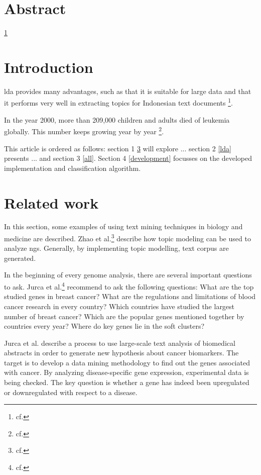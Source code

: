 





\chapter{Abstract}\label{abstract}
\ref{abstract}

\chapter{Introduction}\label{introduction}

\gls{lda} provides many advantages, such as that it is suitable for large data and that it performs very well in extracting topics for Indonesian text documents \footnote{cf.\autocite{twinandilla_2018}}.

In the year 2000, more than 209,000 children and adults died of leukemia globally. This number keeps growing year by year \footnote{cf.\autocite{tang}}.

This article is ordered as follows: section 1 \ref{related} will explore ...
section 2 \ref{lda} presents ... and section 3 \ref{all}. Section 4 \ref{development} focusses on the developed implementation and classification algorithm.

\chapter{Related work}\label{related}

In this section, some examples of using text mining techniques in biology and medicine are described.
Zhao et al.\footnote{cf.\autocite{zhao_2016}} describe how topic modeling can be used to analyze \gls{ngs}. Generally, by implementing topic modelling, text corpus are generated.

In the beginning of every genome analysis, there are several important questions to ask. Jurca et al.\footnote{cf.\autocite{jurca_2016}} recommend to ask the following questions: What are the top studied genes in breast cancer? What are the regulations and limitations of blood cancer research in every country? Which countries have studied the largest number of breast cancer? Which are the popular genes mentioned together by countries every year? Where do key genes lie in the soft clusters?

Jurca et al. describe a process to use large-scale text analysis of biomedical abstracts in order to generate new hypothesis about cancer biomarkers. The target is to develop a data mining methodology to find out the genes associated with cancer. By analyzing disease-specific gene expression, experimental data is being checked. The key question is whether a gene has indeed been upregulated or downregulated with respect to a disease.

